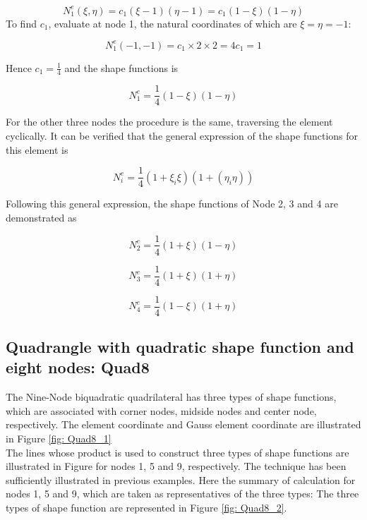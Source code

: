 \begin{equation}
N_1^e\left(\xi, \eta\right) = c_1 \left( \xi -1 \right) \left( \eta - 1\right) = c_1 \left(1 - \xi\right) \left( 1 - \eta \right)
\end{equation}
To find $c_1$, evaluate at node 1, the natural coordinates of which are $\xi = \eta = -1$:

\begin{equation}
N_1^e \left(-1, -1 \right) = c_1 \times 2 \times 2 = 4c_1 = 1
\end{equation}

Hence $c_1 = \frac{1}{4}$ and the shape functions is

\begin{equation}
N_1^e = \frac{1}{4} \left(1 - \xi\right) \left( 1 - \eta\right)
\end{equation}

For the other three nodes the procedure is the same, traversing the element cyclically. It can be verified that the general expression of the shape functions for this element is 

\begin{equation}
N_i^e = \frac{1}{4} \left( 1 + \xi_i \xi\right) \left(1 + \left(\eta_i \eta\right)\right)
\end{equation}

Following this general expression, the shape functions of Node 2, 3 and 4 are demonstrated as

\begin{equation}
N_2^e = \frac{1}{4} \left(1 + \xi\right) \left( 1 - \eta\right)
\end{equation}

\begin{equation}
N_3^e = \frac{1}{4} \left(1 + \xi\right) \left( 1 + \eta\right)
\end{equation}

\begin{equation}
N_4^e = \frac{1}{4} \left(1 - \xi\right) \left( 1 + \eta\right)
\end{equation}


\subsection{Quadrangle with quadratic shape function and  eight nodes: Quad8}

The Nine-Node biquadratic quadrilateral has three types of shape functions, which are associated with corner nodes, midside nodes and center node, respectively. The element coordinate and Gauss element coordinate are illustrated in Figure \ref{fig: Quad8_1} \\
The lines whose product is used to construct three types of shape functions are illustrated in Figure  for nodes 1, 5 and 9, respectively. The technique has been sufficiently illustrated in previous examples. Here the summary of calculation for nodes 1, 5 and 9, which are taken as representatives of the three types: The three types of shape function are represented in Figure \ref{fig: Quad8_2}.

